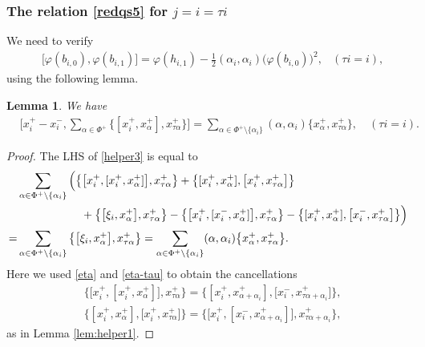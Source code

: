 \documentclass[11pt,reqno]{amsart}
\numberwithin{equation}{section}
\newtheorem{lem}[thm]{Lemma}
\theoremstyle{definition}
\theoremstyle{remark}
\begin{document}
\subsubsection{The relation \eqref{redqs5} for $j=i=\tau i$} 
We need to verify
\begin{align*}
&\big[\varphi(b_{i,0}),\varphi(b_{i,1})\big]= \varphi(h_{i,1})-\tfrac12(\alpha_i,\alpha_i)\big(\varphi(b_{i,0})\big)^2, & (\tau i =i),
\end{align*}
using the following lemma.
\begin{lem}\label{lem:helper3}
We have
\begin{align}
&\Big[x_i^+ -x_i^-,\sum_{\alpha\in\Phi^+}\big\{[x_i^+,x_{\alpha}^+],x_{\tau \alpha}^+\big\}\Big]=\sum_{\alpha\in\Phi^+\setminus\{\alpha_i\}}(\alpha,\alpha_i)\big\{x_{\alpha}^+,x_{\tau\alpha}^+\big\},\quad (\tau i=i).\label{helper3}\end{align}
\end{lem}
\begin{proof}
The LHS of \eqref{helper3} is equal to
\begin{align*}
& \sum_{\alpha\in\Phi^+\setminus\{\alpha_i\}}\Big(\big\{\big[x_i^+,[x_i^+,x_{\alpha}^+]\big],x_{\tau\alpha}^+\big\}+\big\{[x_i^+,x_{\alpha}^+],\big[x_i^+,x_{\tau\alpha}^+\big]\big\}
\\&\hskip2cm+\big\{\big[\xi_i,x_{\alpha}^+\big],x_{\tau\alpha}^+\big\}-\big\{\big[x_i^+,[x_i^-,x_{\alpha}^+]\big],x_{\tau\alpha}^+\big\}-\big\{[x_i^+,x_{\alpha}^+],\big[x_i^-,x_{\tau\alpha}^+\big]\big\}\Big)\\
=&\sum_{\alpha\in\Phi^+\setminus\{\alpha_i\}}\big\{\big[\xi_i,x_{\alpha}^+\big],x_{\tau\alpha}^+\big\}=\sum_{\alpha\in\Phi^+\setminus\{\alpha_i\}}(\alpha,\alpha_i)\big\{x_{\alpha}^+,x_{\tau\alpha}^+\big\}.
\end{align*}
Here we used \eqref{eta} and \eqref{eta-tau} to obtain the cancellations 
\begin{align*}
&\big\{\big[x_i^+,[x_i^+,x_{\alpha}^+]\big],x_{\tau\alpha}^+\big\}=\big\{[x_i^+,x_{\alpha+\alpha_i}^+],\big[x_i^-,x_{\tau\alpha+\alpha_i}^+\big]\big\},\\
&\big\{[x_i^+,x_{\alpha}^+],\big[x_i^+,x_{\tau\alpha}^+\big]\big\}=	\big\{\big[x_i^+,[x_i^-,x_{\alpha+\alpha_i}^+]\big],x_{\tau\alpha+\alpha_i}^+\big\},
\end{align*}
as in Lemma \ref{lem:helper1}. 
\end{proof}
\end{document}
